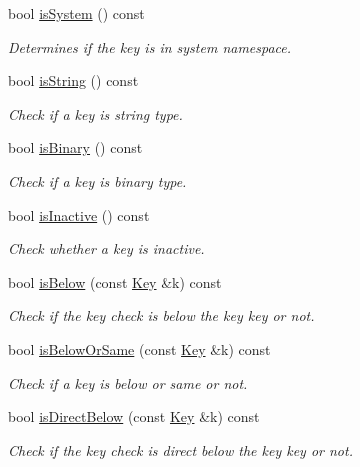 \begin{DoxyCompactItemize}
bool \hyperlink{classkdb_1_1Key_a44833fb97b02ca58205c48d740c4cada}{is\+System} () const
\begin{DoxyCompactList}\small\item\em Determines if the key is in system namespace. \end{DoxyCompactList}\item 
bool \hyperlink{classkdb_1_1Key_a2170b1d9decef951b478454e3ee0b618}{is\+String} () const
\begin{DoxyCompactList}\small\item\em Check if a key is string type. \end{DoxyCompactList}\item 
bool \hyperlink{classkdb_1_1Key_ad748648cb25e2dc77972581e12a5b31c}{is\+Binary} () const
\begin{DoxyCompactList}\small\item\em Check if a key is binary type. \end{DoxyCompactList}\item 
bool \hyperlink{classkdb_1_1Key_a3a27bc4aa9dc8237ce2151ae37fde119}{is\+Inactive} () const
\begin{DoxyCompactList}\small\item\em Check whether a key is inactive. \end{DoxyCompactList}\item 
bool \hyperlink{classkdb_1_1Key_a2ced1c67613e5024f22563318567ed67}{is\+Below} (const \hyperlink{classkdb_1_1Key}{Key} \&k) const
\begin{DoxyCompactList}\small\item\em Check if the key check is below the key key or not. \end{DoxyCompactList}\item 
bool \hyperlink{classkdb_1_1Key_a501eda4871a57faf5f7588a372d8f9c4}{is\+Below\+Or\+Same} (const \hyperlink{classkdb_1_1Key}{Key} \&k) const
\begin{DoxyCompactList}\small\item\em Check if a key is below or same or not. \end{DoxyCompactList}\item 
bool \hyperlink{classkdb_1_1Key_a6b7ce3736c89225445b7cc49d0e62bbe}{is\+Direct\+Below} (const \hyperlink{classkdb_1_1Key}{Key} \&k) const
\begin{DoxyCompactList}\small\item\em Check if the key check is direct below the key key or not. \end{DoxyCompactList}\end{DoxyCompactItemize}


